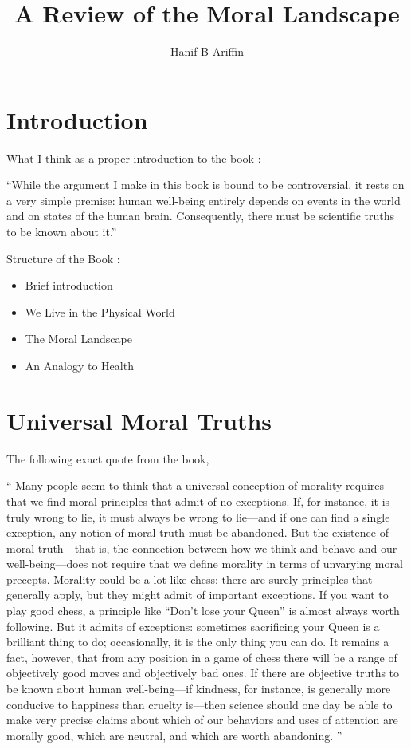 \documentclass[a4paper,12pt]{extbook}
\title{A Review of the Moral Landscape}
\author{Hanif B Ariffin}
\begin{document}
\maketitle
\tableofcontents

\newpage
\section{Introduction}

What I think as a proper introduction to the book :

``While the argument I make in this book is bound to be controversial, it rests on a very simple premise:
human well-being entirely depends on events in the world and on states of the human brain.
Consequently, there must be scientific truths to be known about it.''

Structure of the Book :

\begin{itemize}
    \item Brief introduction
    \item We Live in the Physical World
    \item The Moral Landscape
    \item An Analogy to Health
\end{itemize}

\newpage
\section{Universal Moral Truths}

The following exact quote from the book,

``
Many people seem to think that a universal conception of morality requires that we find moral principles that admit of no exceptions.
If, for instance, it is truly wrong to lie, it must always be wrong to lie—and if one can find a single exception, any notion of moral truth must be abandoned.
But the existence of moral truth—that is, the connection between how we think and behave and our well-being—does not require that we define morality in terms of unvarying moral precepts.
Morality could be a lot like chess:
there are surely principles that generally apply, but they might admit of important exceptions.
If you want to play good chess, a principle like “Don’t lose your Queen” is almost always worth following.
But it admits of exceptions:
sometimes sacrificing your Queen is a brilliant thing to do;
occasionally, it is the only thing you can do.
It remains a fact, however, that from any position in a game of chess there will be a range of objectively good moves and objectively bad ones.
If there are objective truths to be known about human well-being—if kindness, for instance, is generally more conducive to happiness than cruelty is—then science should one day be able to make very precise claims about which of our behaviors and uses of attention are morally good, which are neutral, and which are worth abandoning.
''
\end{document}
